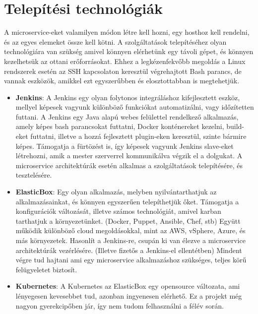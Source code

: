 \documentclass[11pt,magyar,a4paper,oneside,]{report}
\begin{document}
\section{Telepítési
technológiák}\label{telepuxedtuxe9si-technoluxf3giuxe1k}

A microservice-eket valamilyen módon létre kell hozni, egy hosthoz kell
rendelni, és az egyes elemeket össze kell kötni. A szolgáltatások
telepítéséhez olyan technológiára van szükség amivel könnyen elérhetünk
egy távoli gépet, és könnyen kezelhetsük az ottani erőforrásokat. Ehhez
a legkézenfekvőbb megoldás a Linux rendszerek esetén az SSH kapcsolaton
keresztül végrehajtott Bash parancs, de vannak eszközök, amikkel ezt
egyszerűbben és elosztottabban is megtehetjük.

\begin{itemize}
\item
  \textbf{Jenkins}\citep{jenkins}: A Jenkins egy olyan folytonos
  integráláshoz kifejlesztett eszköz, mellyel képesek vagyunk különböző
  funkciókat automatizálni, vagy időzítetten futtani. A Jenkins egy Java
  alapú webes felülettel rendelkező alkalmazás, amely képes bash
  parancsokat futtatni, Docker konténereket kezelni, build-eket
  futtatni, illetve a hozzá fejlesztett plugin-eken keresztül, szinte
  bármire képes. Támogatja a fürtözést is, így képesek vagyunk Jenkins
  slave-eket létrehozni, amik a mester szerverrel kommunikálva végzik el
  a dolgukat. A microservice architektúrák esetén alkalmas a
  szolgáltatások telepítésére, és tesztelésére.
\item
  \textbf{ElasticBox}\citep{elasticbox}: Egy olyan alkalmazás, melyben
  nyilvántarthatjuk az alkalmazásainkat, és könnyen egyszerűen
  telepíthetjük őket. Támogatja a konfigurációk változását, illetve
  számos technológiát, amivel karban tarthatjuk a környezetünket.
  (Docker, Puppet, Ansible, Chef, stb) Együtt működik különböző cloud
  megoldásokkal, mint az AWS, vSphere, Azure, és más környezetek.
  Hasonlít a Jenkins-re, csupán ki van élezve a microservice
  architektúrák vezérlésére. (Illetve fizetős a Jenkins-el ellentétben)
  Mindent végre tud hajtani ami egy microservice alkalmazáshoz
  szükséges, teljes körű felügyeletet biztosít.
  \citep{jenkins-elasticbox}
\item
  \textbf{Kubernetes}\citep{kubernetes}: A Kubernetes az ElasticBox egy
  opensource változata, ami lényegesen kevesebbet tud, azonban
  ingyenesen elérhető. Ez a projekt még nagyon gyerekcipőben jár, így
  nem tudom felhasználni a félév során.
\end{itemize}
\end{document}
